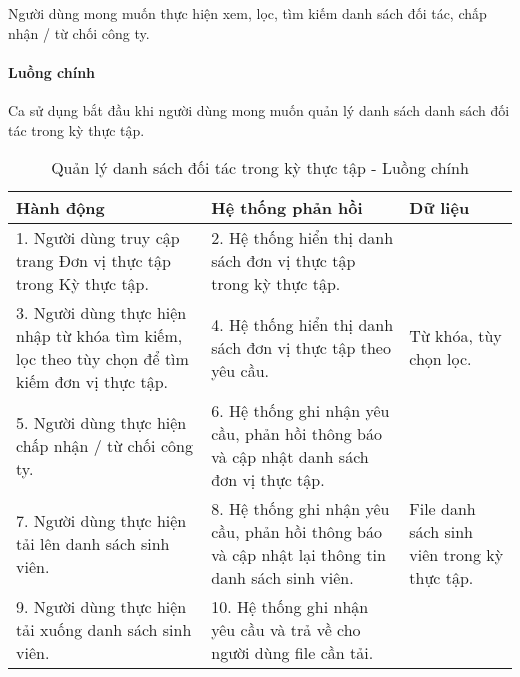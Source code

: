 \documentclass[./../main.tex]{subfiles}
\begin{document}
Người dùng mong muốn thực hiện xem, lọc, tìm kiếm danh sách đối tác, chấp nhận / từ chối công ty.

\paragraph*{Luồng chính} Ca sử dụng bắt đầu khi người dùng mong muốn quản lý danh sách danh sách đối tác trong kỳ thực tập.

\begin{table}[H]
	\caption{Quản lý danh sách đối tác trong kỳ thực tập - Luồng chính}
	\label{tab:orgAdmin_manage_internship_partners}
	\begin{tabularx}{\textwidth}{|X|X|X|}
		\hline
		\textbf{Hành động}                                                                            & \textbf{Hệ thống phản hồi}                                                                      & \textbf{Dữ liệu}                            \\ \hline
		1. Người dùng truy cập trang Đơn vị thực tập trong Kỳ thực tập.                               & 2. Hệ thống hiển thị danh sách đơn vị thực tập trong kỳ thực tập.                               &                                             \\ \hline
		3. Người dùng thực hiện nhập từ khóa tìm kiếm, lọc theo tùy chọn để tìm kiếm đơn vị thực tập. & 4. Hệ thống hiển thị danh sách đơn vị thực tập theo yêu cầu.                                    & Từ khóa, tùy chọn lọc.                      \\ \hline
		5. Người dùng thực hiện chấp nhận / từ chối công ty.                                          & 6. Hệ thống ghi nhận yêu cầu, phản hồi thông báo và cập nhật danh sách đơn vị thực tập.         &                                             \\ \hline
		7. Người dùng thực hiện tải lên danh sách sinh viên.                                          & 8. Hệ thống ghi nhận yêu cầu, phản hồi thông báo và cập nhật lại thông tin danh sách sinh viên. & File danh sách sinh viên trong kỳ thực tập. \\ \hline
		9. Người dùng thực hiện tải xuống danh sách sinh viên.                                        & 10. Hệ thống ghi nhận yêu cầu và trả về cho người dùng file cần tải.                            &                                             \\ \hline
	\end{tabularx}
\end{table}
\end{document}
